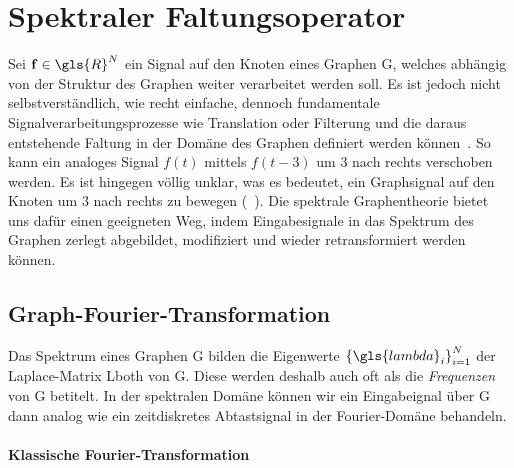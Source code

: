 \section{Spektraler Faltungsoperator}
\label{spektraler_faltungsoperator}

Sei $\ve{f} \in \gls{R}^N$ ein Signal auf den Knoten eines Graphen \gls{G}, welches abhängig von der Struktur des Graphen weiter verarbeitet werden soll.
Es ist jedoch nicht selbstverständlich, wie recht einfache, dennoch fundamentale Signalverarbeitungsprozesse wie Translation oder Filterung und die daraus entstehende Faltung in der Domäne des Graphen definiert werden können~\cite{Shuman}.
So kann \zB{} ein analoges Signal $f\left(t\right)$ mittels $f\left(t-3\right)$ um $3$ nach rechts verschoben werden.
Es ist hingegen völlig unklar, was es bedeutet, ein Graphsignal auf den Knoten um $3$ nach rechts zu bewegen (\vgl{}~\cite{Shuman}).
Die spektrale Graphentheorie bietet uns dafür einen geeigneten Weg, indem Eingabesignale in das Spektrum des Graphen zerlegt \bzw{} abgebildet, modifiziert und wieder retransformiert werden können.

\subsection{Graph-Fourier-Transformation}
\label{graph_fourier_transformation}

Das Spektrum eines Graphen \gls{G} bilden die Eigenwerte ${\left\{\gls{lambda}_i\right\}}_{i=1}^N$ der Laplace-Matrix \gls{Lboth} von \gls{G}.
Diese werden deshalb auch oft als die \emph{Frequenzen} von \gls{G} betitelt.
In der spektralen Domäne können wir ein Eingabeignal  über \gls{G} dann analog wie ein zeitdiskretes Abtastsignal in der Fourier-Domäne behandeln.

\paragraph{Klassische Fourier-Transformation}
\label{klassische_fourier_transformation}

